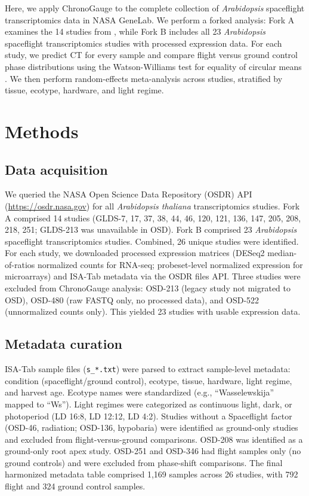 \documentclass[11pt,a4paper]{article}
\begin{document}
Here, we apply ChronoGauge to the complete collection of \textit{Arabidopsis} spaceflight transcriptomics data in NASA GeneLab. We perform a forked analysis: Fork A examines the 14 studies from \citet{Barker2023}, while Fork B includes all 23 \textit{Arabidopsis} spaceflight transcriptomics studies with processed expression data. For each study, we predict CT for every sample and compare flight versus ground control phase distributions using the Watson-Williams test for equality of circular means \citep{Watson1956}. We then perform random-effects meta-analysis across studies, stratified by tissue, ecotype, hardware, and light regime.

\section*{Methods}

\subsection*{Data acquisition}

We queried the NASA Open Science Data Repository (OSDR) API (\url{https://osdr.nasa.gov}) for all \textit{Arabidopsis thaliana} transcriptomics studies. Fork A comprised 14 studies (GLDS-7, 17, 37, 38, 44, 46, 120, 121, 136, 147, 205, 208, 218, 251; GLDS-213 was unavailable in OSD). Fork B comprised 23 \textit{Arabidopsis} spaceflight transcriptomics studies. Combined, 26 unique studies were identified. For each study, we downloaded processed expression matrices (DESeq2 median-of-ratios normalized counts for RNA-seq; probeset-level normalized expression for microarrays) and ISA-Tab metadata via the OSDR files API. Three studies were excluded from ChronoGauge analysis: OSD-213 (legacy study not migrated to OSD), OSD-480 (raw FASTQ only, no processed data), and OSD-522 (unnormalized counts only). This yielded 23 studies with usable expression data.

\subsection*{Metadata curation}

ISA-Tab sample files (\texttt{s\_*.txt}) were parsed to extract sample-level metadata: condition (spaceflight/ground control), ecotype, tissue, hardware, light regime, and harvest age. Ecotype names were standardized (e.g., ``Wasselewskija'' mapped to ``Ws''). Light regimes were categorized as continuous light, dark, or photoperiod (LD 16:8, LD 12:12, LD 4:2). Studies without a Spaceflight factor (OSD-46, radiation; OSD-136, hypobaria) were identified as ground-only studies and excluded from flight-versus-ground comparisons. OSD-208 was identified as a ground-only root apex study. OSD-251 and OSD-346 had flight samples only (no ground controls) and were excluded from phase-shift comparisons. The final harmonized metadata table comprised 1,169 samples across 26 studies, with 792 flight and 324 ground control samples.
\end{document}
